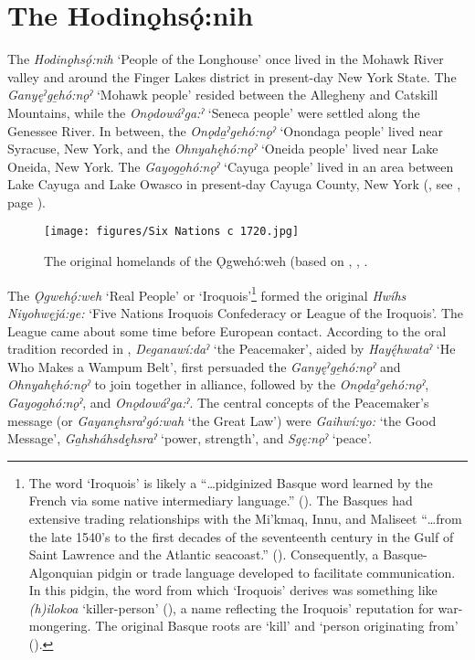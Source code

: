 \chapter{The Hodinǫ̱hsǫ́:nih}
\label{ch:The Hodinǫhsǫ́:nih}
The \textit{Hodinǫ̱hsǫ́:nih} ‘People of the Longhouse’ once lived in the Mohawk River valley and around the Finger Lakes district in present-day New York State. The \textit{Ganyęˀge̱hó:nǫˀ} ‘Mohawk people’ resided between the Allegheny and Catskill Mountains, while the \textit{Onǫdowáˀga:ˀ} ‘Seneca people’ were settled along the Gene\-ssee River. In between, the \textit{Onǫda̱ˀgehó:nǫˀ} ‘Onondaga people’ lived near Syracuse, New York, and the \textit{Ohnyahęhó:nǫˀ} ‘Oneida people’ lived near Lake Oneida, New York. The \textit{Gayogo̱hó:nǫˀ} ‘Cayuga people’ lived in an area between Lake Cayuga and Lake Owasco in present-day Cayuga County, New York (\cite[3--6]{michelson_comparative_1988}, see , page \pageref{map:original.home}).

\begin{figure}
\texttt{[image: figures/Six Nations c 1720.jpg]}
\caption{The original homelands of the Ǫgwehó:weh (based on \citet{morgan_lewis_henry_map_1720}, \citet{gisgeography_new_2013}, \citet{nonenmacher_iroquois_2004}.}
\label{map:original.home}
\end{figure}

The \textit{Ǫgwehǫ́:weh} ‘Real People’ or ‘Iroquois’\footnote{The word ‘Iroquois’ is likely a “…pidginized Basque word learned by the French via some native intermediary language.” (\cite[1122]{bakker_basque_1991}). The Basques had extensive trading relationships with the Mi’kmaq, Innu, and Maliseet “…from the late 1540’s to the first decades of the seventeenth century in the Gulf of Saint Lawrence and the Atlantic seacoast.” (\cite[1120]{bakker_basque_1991}). Consequently, a Basque-Algonquian pidgin or trade language developed to facilitate communication. In this pidgin, the word from which ‘Iroquois’ derives was something like \textit{(h)ilo\-koa} ‘killer-person’ (\cite[1122--1123]{bakker_basque_1991}), a name reflecting the Iroquois’ reputation for war-mongering. The original Basque roots are  ‘kill’ and  ‘person originating from’ (\cite[1121]{bakker_basque_1991}).} formed the original \textit{Hwíhs Niyohwęjá:ge:} ‘Five Nations Iroquois Confederacy or League of the Iroquois’. The League came about some time before European contact. According to the oral tradition recorded in \citet[xix-xxxi]{gibson_concerning_1992}, \textit{Deganawí:daˀ} ‘the Peacemaker’, aided by \textit{Hayę́hwataˀ} ‘He Who Makes a Wampum Belt’, first persuaded the \textit{Ga\-nyęˀge̱hó:nǫˀ} and \textit{Ohnyahęhó:nǫˀ} to join together in alliance, followed by the \textit{Onǫda̱ˀgehó:nǫˀ}, \textit{Gayogo̱hó:nǫˀ}, and \textit{Onǫdowáˀga:ˀ}. The central concepts of the Peacemaker’s message (or \textit{Gayanę̱hsraˀgó:wah} ‘the Great Law’) were \textit{Gaihwí:yo:} ‘the Good Message’, \textit{Ga̱hsháhsdę̱hsraˀ} ‘power, strength’, and \textit{Sgę:nǫˀ} ‘peace’.

